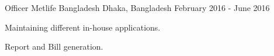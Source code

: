 \begin{cventries}
\cventry
{Officer} %
{Metlife Bangladesh} %
{Dhaka, Bangladesh} %
{February 2016 - June 2016} %
{
	\begin{cvitems} %
		\item {Maintaining different in-house applications.}
		\item {Report and Bill generation.}
	\end{cvitems}
}
\end{cventries}
